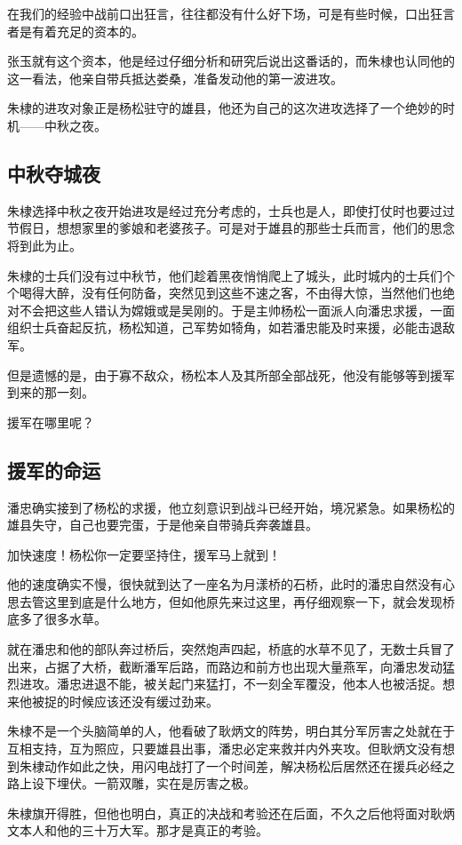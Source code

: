 \begin{multicols}{\theparacolNo}
		在我们的经验中战前口出狂言，往往都没有什么好下场，可是有些时候，口出狂言者是有着充足的资本的。

		张玉就有这个资本，他是经过仔细分析和研究后说出这番话的，而朱棣也认同他的这一看法，他亲自带兵抵达娄桑，准备发动他的第一波进攻。

		朱棣的进攻对象正是杨松驻守的雄县，他还为自己的这次进攻选择了一个绝妙的时机——中秋之夜。

		\subsection{中秋夺城夜}
		朱棣选择中秋之夜开始进攻是经过充分考虑的，士兵也是人，即使打仗时也要过过节假日，想想家里的爹娘和老婆孩子。可是对于雄县的那些士兵而言，他们的思念将到此为止。

		朱棣的士兵们没有过中秋节，他们趁着黑夜悄悄爬上了城头，此时城内的士兵们个个喝得大醉，没有任何防备，突然见到这些不速之客，不由得大惊，当然他们也绝对不会把这些人错认为嫦娥或是吴刚的。于是主帅杨松一面派人向潘忠求援，一面组织士兵奋起反抗，杨松知道，己军势如犄角，如若潘忠能及时来援，必能击退敌军。

		但是遗憾的是，由于寡不敌众，杨松本人及其所部全部战死，他没有能够等到援军到来的那一刻。

		援军在哪里呢？

		\subsection{援军的命运}
		潘忠确实接到了杨松的求援，他立刻意识到战斗已经开始，境况紧急。如果杨松的雄县失守，自己也要完蛋，于是他亲自带骑兵奔袭雄县。

		加快速度！杨松你一定要坚持住，援军马上就到！

		他的速度确实不慢，很快就到达了一座名为月漾桥的石桥，此时的潘忠自然没有心思去管这里到底是什么地方，但如他原先来过这里，再仔细观察一下，就会发现桥底多了很多水草。

		就在潘忠和他的部队奔过桥后，突然炮声四起，桥底的水草不见了，无数士兵冒了出来，占据了大桥，截断潘军后路，而路边和前方也出现大量燕军，向潘忠发动猛烈进攻。潘忠进退不能，被关起门来猛打，不一刻全军覆没，他本人也被活捉。想来他被捉的时候应该还没有缓过劲来。

		朱棣不是一个头脑简单的人，他看破了耿炳文的阵势，明白其分军厉害之处就在于互相支持，互为照应，只要雄县出事，潘忠必定来救并内外夹攻。但耿炳文没有想到朱棣动作如此之快，用闪电战打了一个时间差，解决杨松后居然还在援兵必经之路上设下埋伏。一箭双雕，实在是厉害之极。

		朱棣旗开得胜，但他也明白，真正的决战和考验还在后面，不久之后他将面对耿炳文本人和他的三十万大军。那才是真正的考验。


\end{multicols}
